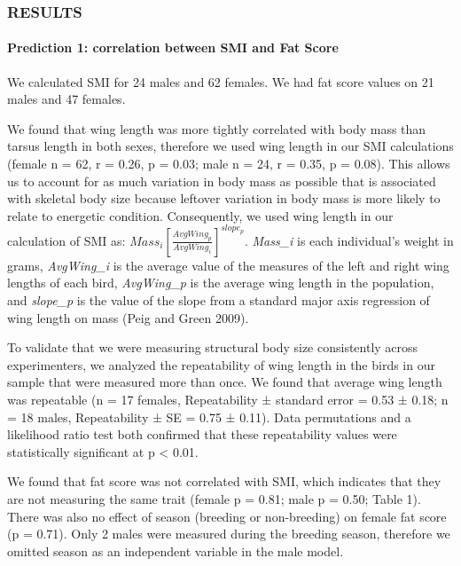 \documentclass[
]{article}
\begin{document}
\hypertarget{results}{%
\subsubsection{RESULTS}\label{results}}

\hypertarget{prediction-1-correlation-between-smi-and-fat-score}{%
\paragraph{Prediction 1: correlation between SMI and Fat
Score}\label{prediction-1-correlation-between-smi-and-fat-score}}

We calculated SMI for 24 males and 62 females. We had fat score values
on 21 males and 47 females.

We found that wing length was more tightly correlated with body mass
than tarsus length in both sexes, therefore we used wing length in our
SMI calculations (female n = 62, r = 0.26, p = 0.03; male n = 24, r =
0.35, p = 0.08). This allows us to account for as much variation in body
mass as possible that is associated with skeletal body size because
leftover variation in body mass is more likely to relate to energetic
condition. Consequently, we used wing length in our calculation of SMI
as: \(Mass_i\left[ \frac{AvgWing_p}{AvgWing_i} \right]^{slope_p}\).
\emph{Mass\_i} is each individual's weight in grams, \emph{AvgWing\_i}
is the average value of the measures of the left and right wing lengths
of each bird, \emph{AvgWing\_p} is the average wing length in the
population, and \emph{slope\_p} is the value of the slope from a
standard major axis regression of wing length on mass (Peig and Green
2009).

To validate that we were measuring structural body size consistently
across experimenters, we analyzed the repeatability of wing length in
the birds in our sample that were measured more than once. We found that
average wing length was repeatable (n = 17 females, Repeatability ±
standard error = 0.53 ± 0.18; n = 18 males, Repeatability ± SE = 0.75 ±
0.11). Data permutations and a likelihood ratio test both confirmed that
these repeatability values were statistically significant at p
\textless{} 0.01.

We found that fat score was not correlated with SMI, which indicates
that they are not measuring the same trait (female p = 0.81; male p =
0.50; Table 1). There was also no effect of season (breeding or
non-breeding) on female fat score (p = 0.71). Only 2 males were measured
during the breeding season, therefore we omitted season as an
independent variable in the male model.
\end{document}
